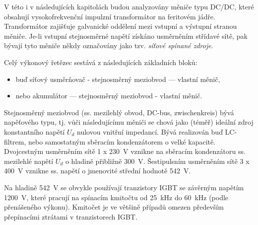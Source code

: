     V této i v následujících kapitolách budou analyzovány měniče typu DC/DC, které obsahují 
    vysokofrekvenční impulzní transformátor na feritovém jádře. Transformátor zajišťuje galvanické 
    oddělení mezi vstupní a výstupní stranou měniče. Je-li vstupní stejnosměrné napětí získáno 
    usměrněním střídavé sítě, pak bývají tyto měniče někdy označovány jako tzv. \emph{síťové spínané 
    zdroje}.
    
    Celý výkonový řetězec sestává z následujících základních bloků:
    \begin{itemize}
      \item buď síťový usměrňovač - stejnosměrný meziobvod — vlastní měnič,
      \item nebo akumulátor — stejnosměrný meziobvod - vlastní měnič.
    \end{itemize}
    
    Stejnosměrný meziobvod (ss. mezilehlý obvod, DC-bus, zwischenkreis) bývá napěťového typu, tj. 
    vůči následujícímu měniči se chová jako (téměř) ideální zdroj konstantního napětí \(U_d\) 
    nulovou vnitřní impedancí. Bývá realizován buď LC-filtrem, nebo samostatným sběracím 
    kondenzátorem o velké kapacitě. Dvojcestným usměrněním sítě 1 x \SI{230}{\volt} vznikne na 
    sběracím kondenzátoru ss. mezilehlé napětí \(U_d\) o hladině přibližně \SI{300}{\volt}. 
    Šestipulsním usměrněním sítě 3 x \SI{400}{\volt} vznikne ss. napětí o jmenovité střední hodnotě 
    \SI{542}{\volt}.
    
    Na hladině \SI{542}{\volt} se obvykle používají tranzistory IGBT se závěrným napětím 
    \SI{1200}{\volt}, které pracují na spínacím kmitočtu od \SI{25}{\kilo\hertz} do 
    \SI{60}{\kilo\hertz} (podle přenášeného výkonu). Kmitočet je ve většině případů omezen především 
    přepínacími ztrátami v tranzistorech IGBT.
    
